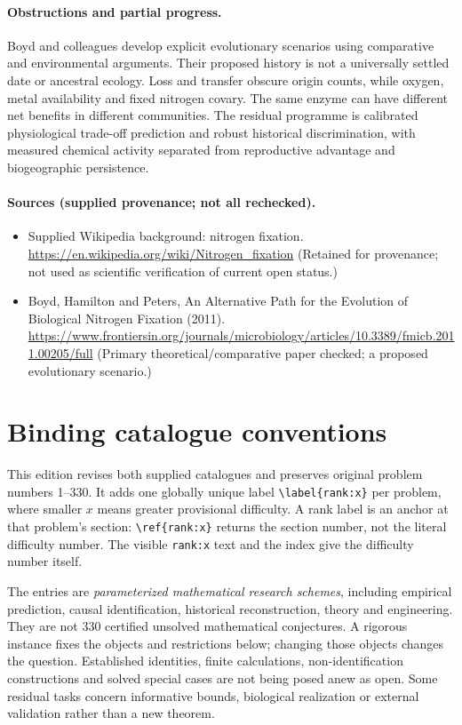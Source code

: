 \documentclass[11pt]{article}
\begin{document}
\paragraph{Obstructions and partial progress.} Boyd and colleagues develop explicit evolutionary scenarios using comparative and environmental arguments. Their proposed history is not a universally settled date or ancestral ecology. Loss and transfer obscure origin counts, while oxygen, metal availability and fixed nitrogen covary. The same enzyme can have different net benefits in different communities. The residual programme is calibrated physiological trade-off prediction and robust historical discrimination, with measured chemical activity separated from reproductive advantage and biogeographic persistence.

\paragraph{Sources (supplied provenance; not all rechecked).} \begin{itemize}
\item Supplied Wikipedia background: nitrogen fixation. \url{https://en.wikipedia.org/wiki/Nitrogen_fixation} (Retained for provenance; not used as scientific verification of current open status.)
\item Boyd, Hamilton and Peters, An Alternative Path for the Evolution of Biological Nitrogen Fixation (2011). \url{https://www.frontiersin.org/journals/microbiology/articles/10.3389/fmicb.2011.00205/full} (Primary theoretical/comparative paper checked; a proposed evolutionary scenario.)
\end{itemize}


\section*{Binding catalogue conventions}
This edition revises both supplied catalogues and preserves original problem numbers 1--330. It adds one globally unique label \verb|\label{rank:x}| per problem, where smaller $x$ means greater provisional difficulty. A rank label is an anchor at that problem's section: \verb|\ref{rank:x}| returns the section number, not the literal difficulty number. The visible \texttt{rank:x} text and the index give the difficulty number itself.

The entries are \emph{parameterized mathematical research schemes}, including empirical prediction, causal identification, historical reconstruction, theory and engineering. They are not 330 certified unsolved mathematical conjectures. A rigorous instance fixes the objects and restrictions below; changing those objects changes the question. Established identities, finite calculations, non-identification constructions and solved special cases are not being posed anew as open. Some residual tasks concern informative bounds, biological realization or external validation rather than a new theorem.
\end{document}
